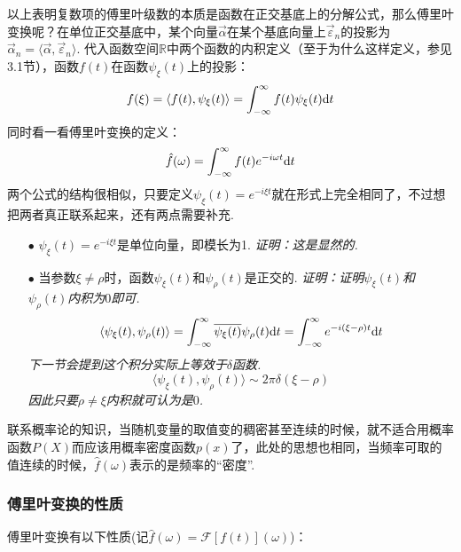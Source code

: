 \documentclass[UTF8]{ctexart}
\newcommand{\trm}[1]{{\rm #1}}
\begin{document}
以上表明复数项的傅里叶级数的本质是函数在正交基底上的分解公式，那么傅里叶变换呢？在单位正交基底中，某个向量\(\vec{\alpha}\)在某个基底向量上\(\vec{\varepsilon}_n\)的投影为\(\vec{\alpha}_n = \langle \vec{\alpha},\vec{\varepsilon}_n \rangle\). 代入函数空间\(\mathbb{R}\)中两个函数的内积定义（至于为什么这样定义，参见3.1节），函数\(f(t)\)在函数\(\psi_{\xi}(t)\)上的投影：
\[f(\xi) = \langle f(t), \psi_{\xi}(t) \rangle = \int_{-\infty}^{\infty}f(t)\psi_{\xi}(t)\trm{d}t\]
同时看一看傅里叶变换的定义：
\[\hat{f}(\omega) = \int_{-\infty}^{\infty}f(t)e^{-i\omega t}\trm{d}t\]
两个公式的结构很相似，只要定义\(\psi_{\xi}(t)=e^{-i\xi t}\)就在形式上完全相同了，不过想把两者真正联系起来，还有两点需要补充.
\begin{itemize}
    \item [\(\bullet\)] \(\psi_{\xi}(t)=e^{-i\xi t}\)是单位向量，即模长为1. 
    \newline
    \textit{
        证明：这是显然的.
    }
    \item [\(\bullet\)] 当参数\(\xi\neq\rho\)时，函数\(\psi_{\xi}(t)\)和\(\psi_{\rho}(t)\)是正交的. 
    \newline
    \textit{
        证明：证明\(\psi_{\xi}(t)\)和\(\psi_{\rho}(t)\)内积为\(0\)即可.
        \[\langle \psi_{\xi}(t),\psi_{\rho}(t) \rangle = \int_{-\infty}^{\infty}\overline{\psi_{\xi}(t)}\psi_{\rho}(t)\trm{d}t = \int_{-\infty}^{\infty}e^{-i(\xi-\rho)t}\trm{d}t\]
        下一节会提到这个积分实际上等效于\(\delta\)函数.
        \[\langle \psi_{\xi}(t),\psi_{\rho}(t) \rangle \sim 2\pi\delta(\xi-\rho)\]
        因此只要\(\rho \neq \xi\)内积就可认为是\(0\).
    }
\end{itemize}

联系概率论的知识，当随机变量的取值变的稠密甚至连续的时候，就不适合用概率函数\(P(X)\)而应该用概率密度函数\(p(x)\)了，此处的思想也相同，当频率可取的值连续的时候，\(\hat{f}(\omega)\)表示的是频率的“密度”.

\subsubsection{傅里叶变换的性质}

傅里叶变换有以下性质(记\(\hat{f}(\omega)=\mathcal{F}[f(t)](\omega)\))：\\
\end{document}
